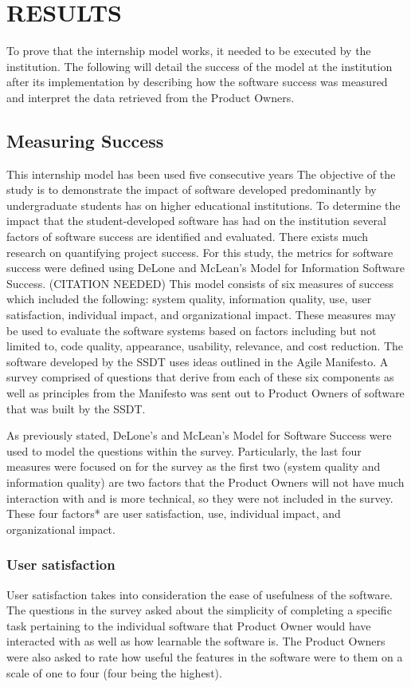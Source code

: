 \section{RESULTS}
To prove that the internship model works, it needed to be executed by the institution. The following will detail the success of the model at the institution after its implementation by describing how the software success was measured and interpret the data retrieved from the Product Owners.

\subsection{Measuring Success}
This internship model has been used five consecutive years The objective of the study is to demonstrate the impact of software developed predominantly by undergraduate students has on higher educational institutions. To determine the impact that the student-developed software has had on the institution several factors of software success are identified and evaluated.  There exists much research on quantifying project success. For this study, the metrics for software success were defined using DeLone and McLean’s Model for Information Software Success. (CITATION NEEDED) This model consists of six measures of success which included the following: system quality, information quality, use, user satisfaction, individual impact, and organizational impact. These measures may be used to evaluate the software systems based on factors including but not limited to, code quality, appearance, usability, relevance, and cost reduction. The software developed by the SSDT uses ideas outlined in the Agile Manifesto. A survey comprised of questions that derive from each of these six components as well as principles from the Manifesto was sent out to Product Owners of software that was built by the SSDT.

As previously stated, DeLone's and McLean's Model for Software Success were used to model the questions within the survey. Particularly, the last four measures were focused on for the survey as the first two (system quality and information quality) are two factors that the Product Owners will not have much interaction with and is more technical, so they were not included in the survey. These four factors* are user satisfaction, use, individual impact, and organizational impact.

\subsubsection{User satisfaction}
User satisfaction takes into consideration the ease of usefulness of the software. The questions in the survey asked about the simplicity of completing a specific task pertaining to the individual software that Product Owner would have interacted with as well as how learnable the software is. The Product Owners were also asked to rate how useful the features in the software were to them on a scale of one to four (four being the highest).

